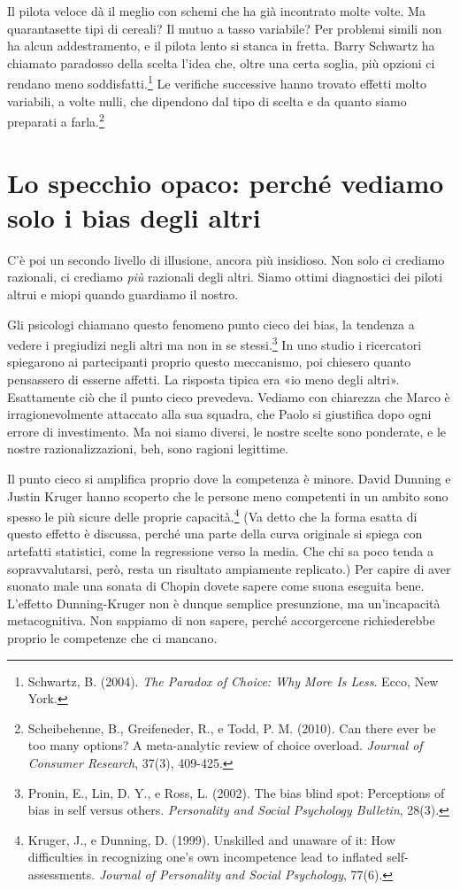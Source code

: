 Il pilota veloce dà il meglio con schemi che ha già incontrato molte volte. Ma quarantasette tipi di cereali? Il mutuo a tasso variabile? Per problemi simili non ha alcun addestramento, e il pilota lento si stanca in fretta. Barry Schwartz ha chiamato paradosso della scelta l'idea che, oltre una certa soglia, più opzioni ci rendano meno soddisfatti.\footnote{Schwartz, B. (2004). \textit{The Paradox of Choice: Why More Is Less}. Ecco, New York.} Le verifiche successive hanno trovato effetti molto variabili, a volte nulli, che dipendono dal tipo di scelta e da quanto siamo preparati a farla.\footnote{Scheibehenne, B., Greifeneder, R., e Todd, P. M. (2010). Can there ever be too many options? A meta-analytic review of choice overload. \textit{Journal of Consumer Research}, 37(3), 409-425.}

\section{Lo specchio opaco: perché vediamo solo i bias degli altri}
\label{sec:p1c7-specchio-opaco}

C'è poi un secondo livello di illusione, ancora più insidioso. Non solo ci crediamo razionali, ci crediamo \textit{più} razionali degli altri. Siamo ottimi diagnostici dei piloti altrui e miopi quando guardiamo il nostro.

Gli psicologi chiamano questo fenomeno punto cieco dei bias, la tendenza a vedere i pregiudizi negli altri ma non in se stessi.\footnote{Pronin, E., Lin, D. Y., e Ross, L. (2002). The bias blind spot: Perceptions of bias in self versus others. \textit{Personality and Social Psychology Bulletin}, 28(3).} In uno studio i ricercatori spiegarono ai partecipanti proprio questo meccanismo, poi chiesero quanto pensassero di esserne affetti. La risposta tipica era «io meno degli altri». Esattamente ciò che il punto cieco prevedeva. Vediamo con chiarezza che Marco è irragionevolmente attaccato alla sua squadra, che Paolo si giustifica dopo ogni errore di investimento. Ma noi siamo diversi, le nostre scelte sono ponderate, e le nostre razionalizzazioni, beh, sono ragioni legittime.

Il punto cieco si amplifica proprio dove la competenza è minore. David Dunning e Justin Kruger hanno scoperto che le persone meno competenti in un ambito sono spesso le più sicure delle proprie capacità.\footnote{Kruger, J., e Dunning, D. (1999). Unskilled and unaware of it: How difficulties in recognizing one's own incompetence lead to inflated self-assessments. \textit{Journal of Personality and Social Psychology}, 77(6).} (Va detto che la forma esatta di questo effetto è discussa, perché una parte della curva originale si spiega con artefatti statistici, come la regressione verso la media. Che chi sa poco tenda a sopravvalutarsi, però, resta un risultato ampiamente replicato.) Per capire di aver suonato male una sonata di Chopin dovete sapere come suona eseguita bene. L'effetto Dunning-Kruger non è dunque semplice presunzione, ma un'incapacità metacognitiva. Non sappiamo di non sapere, perché accorgercene richiederebbe proprio le competenze che ci mancano.

